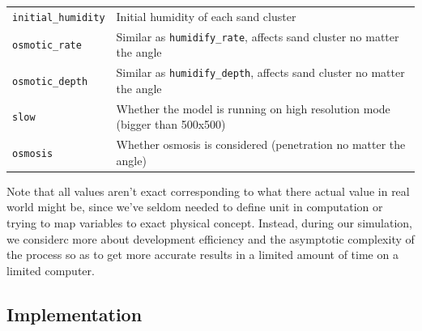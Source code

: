 \documentclass[12pt]{article}
\begin{document}
\begin{table}[H]
\begin{tabular}{p{3cm}p{12cm}}
        \texttt{initial\_humidity} & Initial humidity of each sand cluster                                                                       \\
        \texttt{osmotic\_rate}     & Similar as \texttt{humidify\_rate}, affects sand cluster no matter the angle                                \\
        \texttt{osmotic\_depth}    & Similar as \texttt{humidify\_depth}, affects sand cluster no matter the angle                               \\
        \texttt{slow}              & Whether the model is running on high resolution mode (bigger than 500x500)                                  \\
        \texttt{osmosis}           & Whether osmosis is considered (penetration no matter the angle)                                             \\
        \hline
    \end{tabular}
    \label{tab:top_view_nomenclature}
\end{table}

Note that all values aren't exact corresponding to what there actual value in real world might be, since we've seldom needed to define unit in computation or trying to map variables to exact physical concept. Instead, during our simulation, we considerc more about development efficiency and the asymptotic complexity of the process so as to get more accurate results in a limited amount of time on a limited computer.

\subsection{Implementation}
\end{document}

